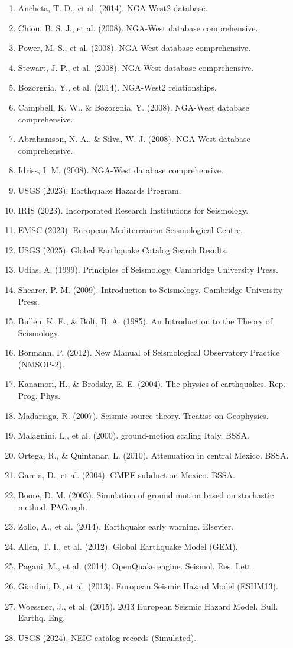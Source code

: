 \documentclass[12pt,a4paper]{article}
\begin{document}
\begin{enumerate}
    \item Ancheta, T. D., et al. (2014). NGA-West2 database.
    \item Chiou, B. S. J., et al. (2008). NGA-West database comprehensive.
    \item Power, M. S., et al. (2008). NGA-West database comprehensive.
    \item Stewart, J. P., et al. (2008). NGA-West database comprehensive.
    \item Bozorgnia, Y., et al. (2014). NGA-West2 relationships.
    \item Campbell, K. W., \& Bozorgnia, Y. (2008). NGA-West database comprehensive.
    \item Abrahamson, N. A., \& Silva, W. J. (2008). NGA-West database comprehensive.
    \item Idriss, I. M. (2008). NGA-West database comprehensive.
    \item USGS (2023). Earthquake Hazards Program.
    \item IRIS (2023). Incorporated Research Institutions for Seismology.
    \item EMSC (2023). European-Mediterranean Seismological Centre.
    \item USGS (2025). Global Earthquake Catalog Search Results.
    \item Udias, A. (1999). Principles of Seismology. Cambridge University Press.
    \item Shearer, P. M. (2009). Introduction to Seismology. Cambridge University Press.
    \item Bullen, K. E., \& Bolt, B. A. (1985). An Introduction to the Theory of Seismology.
    \item Bormann, P. (2012). New Manual of Seismological Observatory Practice (NMSOP-2).
    \item Kanamori, H., \& Brodsky, E. E. (2004). The physics of earthquakes. Rep. Prog. Phys.
    \item Madariaga, R. (2007). Seismic source theory. Treatise on Geophysics.
    \item Malagnini, L., et al. (2000). ground-motion scaling Italy. BSSA.
    \item Ortega, R., \& Quintanar, L. (2010). Attenuation in central Mexico. BSSA.
    \item Garcia, D., et al. (2004). GMPE subduction Mexico. BSSA.
    \item Boore, D. M. (2003). Simulation of ground motion based on stochastic method. PAGeoph.
    \item Zollo, A., et al. (2014). Earthquake early warning. Elsevier.
    \item Allen, T. I., et al. (2012). Global Earthquake Model (GEM).
    \item Pagani, M., et al. (2014). OpenQuake engine. Seismol. Res. Lett.
    \item Giardini, D., et al. (2013). European Seismic Hazard Model (ESHM13).
    \item Woessner, J., et al. (2015). 2013 European Seismic Hazard Model. Bull. Earthq. Eng.
    \item USGS (2024). NEIC catalog records (Simulated).
\end{enumerate}
\end{document}
